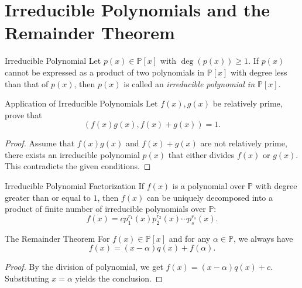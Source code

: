 \section{Irreducible Polynomials and the Remainder Theorem}

\begin{definition}{Irreducible Polynomial}{}
  Let $p(x) \in \mathbb{P}[x]$ with $\operatorname{deg}(p(x)) \geq 1$.
  If $p(x)$ cannot be expressed as a product of two polynomials in
  $\mathbb{P}[x]$
  with degree less than that of $p(x)$,
  then $p(x)$ is called an \emph{irreducible polynomial in $\mathbb{P}[x]$}.
\end{definition}

\begin{example}{Application of Irreducible Polynomials}{}
  Let $f(x), g(x)$ be relatively prime, prove that
  \begin{equation}
    (f(x)g(x), f(x) + g(x)) = 1.
  \end{equation}
\end{example}

\begin{proof}
  Assume that $f(x)g(x)$ and $f(x) + g(x)$ are not relatively prime,
  there exists an irreducible polynomial $p(x)$ that either divides $f(x)$ or
  $g(x)$. This contradicts the given conditions.
\end{proof}

\begin{theorem}{Irreducible Polynomial Factorization}{}
  If $f(x)$ is a polynomial over $\mathbb{P}$ with degree greater than or equal
  to $1$, then $f(x)$ can be uniquely decomposed into a product of finite number
  of irreducible polynomials over $\mathbb{P}$:
  \begin{equation}
    f(x) = cp_1^{r_1}(x) p_2^{r_2}(x) \cdots p_s^{r_s}(x).
  \end{equation}
\end{theorem}

\begin{theorem}{The Remainder Theorem}{}
  For $f(x) \in \mathbb{P}[x]$ and for any $\alpha \in \mathbb{P}$,
  we always have
  \begin{equation}
    f(x) = (x - \alpha)q(x) + f(\alpha).
  \end{equation}
\end{theorem}

\begin{proof}
  By the division of polynomial, we get $f(x) = (x-\alpha)q(x) + c$.
  Substituting $x = \alpha$ yields the conclusion.
\end{proof}

